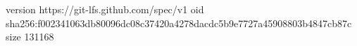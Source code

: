 version https://git-lfs.github.com/spec/v1
oid sha256:f002341063db80096dc08c37420a4278dacdc5b9e7727a45908803b4847cb87c
size 131168
